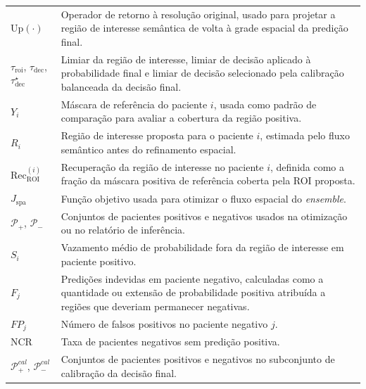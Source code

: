 \begin{longtable}{p{3.0cm}p{12.0cm}}
  $\mathrm{Up}(\cdot)$ &
  Operador de retorno à resolução original, usado para projetar a região de
  interesse semântica de volta à grade espacial da predição final.\\

  $\tau_{\mathrm{roi}}$, $\tau_{\mathrm{dec}}$, $\tau_{\mathrm{dec}}^\star$ &
  Limiar da região de interesse, limiar de decisão aplicado à probabilidade final
  e limiar de decisão selecionado pela calibração balanceada da decisão final.\\

  $Y_i$ &
  Máscara de referência do paciente $i$, usada como padrão de comparação para
  avaliar a cobertura da região positiva.\\

  $R_i$ &
  Região de interesse proposta para o paciente $i$, estimada pelo fluxo
  semântico antes do refinamento espacial.\\

  $\mathrm{Rec}_{\mathrm{ROI}}^{(i)}$ &
  Recuperação da região de interesse no paciente $i$, definida como a fração da
  máscara positiva de referência coberta pela ROI proposta.\\

  $J_{\mathrm{spa}}$ &
  Função objetivo usada para otimizar o fluxo espacial do \textit{ensemble}.\\

  $\mathcal{P}_+$, $\mathcal{P}_-$ &
  Conjuntos de pacientes positivos e negativos usados na otimização ou no
  relatório de inferência.\\

  $S_i$ &
  Vazamento médio de probabilidade fora da região de interesse em paciente
  positivo.\\

  $F_j$ &
  Predições indevidas em paciente negativo, calculadas como a quantidade ou
  extensão de probabilidade positiva atribuída a regiões que deveriam permanecer
  negativas.\\

  $FP_j$ &
  Número de falsos positivos no paciente negativo $j$.\\

  $\mathrm{NCR}$ &
  Taxa de pacientes negativos sem predição positiva.\\

  $\mathcal{P}_+^{cal}$, $\mathcal{P}_-^{cal}$ &
  Conjuntos de pacientes positivos e negativos no subconjunto de calibração da
  decisão final.\\


\end{longtable}
